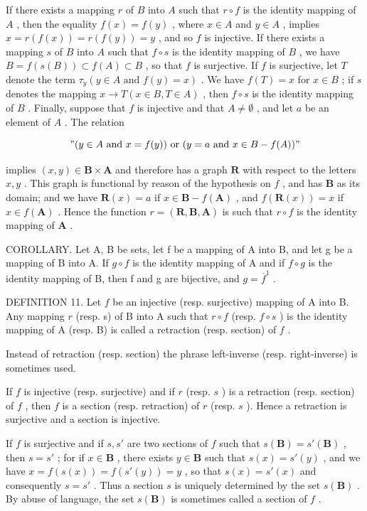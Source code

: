 If there exists a mapping \(r\) of \(B\) into \(A\) such that \(r \circ f\) is the identity mapping of \(A\) , then the equality \(f(x) = f(y)\) , where \(x \in A\) and \(y \in A\) , implies \(x = r(f(x)) = r(f(y)) = y\) , and so \(f\) is injective. If there exists a mapping \(s\) of \(B\) into \(A\) such that \(f \circ s\) is the identity mapping of \(B\) , we have \(B = f(s(B)) \subset f(A) \subset B\) , so that \(f\) is surjective. If \(f\) is surjective, let \(T\) denote the term \(\tau_y(y \in A \text{ and } f(y) = x)\) . We have \(f(T) = x\) for \(x \in B\) ; if \(s\) denotes the mapping \(x \to T (x \in B, T \in A)\) , then \(f \circ s\) is the identity mapping of \(B\) . Finally, suppose that \(f\) is injective and that \(A \neq \emptyset\) , and let \(a\) be an element of \(A\) . The relation

\[
" (y \in A \text {   and   } x = f (y)) \text {   or   } (y = a \text {   and   } x \in B - f (A))"
\]

implies \((x, y) \in \mathbf{B} \times \mathbf{A}\) and therefore has a graph \(\mathbf{R}\) with respect to the letters \(x, y\) . This graph is functional by reason of the hypothesis on \(f\) , and has \(\mathbf{B}\) as its domain; and we have \(\mathbf{R}(x) = a\) if \(x \in \mathbf{B} - f(\mathbf{A})\) , and \(f(\mathbf{R}(x)) = x\) if \(x \in f(\mathbf{A})\) . Hence the function \(r = (\mathbf{R}, \mathbf{B}, \mathbf{A})\) is such that \(r \circ f\) is the identity mapping of \(\mathbf{A}\) .

COROLLARY. Let A, B be sets, let f be a mapping of A into B, and let g be a mapping of B into A. If \(g \circ f\) is the identity mapping of A and if \(f \circ g\) is the identity mapping of B, then f and g are bijective, and \(g = \overline{f}^{1}\) .

DEFINITION 11. Let \(f\) be an injective (resp. surjective) mapping of A into B. Any mapping \(r\) (resp. s) of B into A such that \(r \circ f\) (resp. \(f \circ s\) ) is the identity mapping of A (resp. B) is called a retraction (resp. section) of \(f\) .

Instead of retraction (resp. section) the phrase left-inverse (resp. right-inverse) is sometimes used.

If \(f\) is injective (resp. surjective) and if \(r\) (resp. \(s\) ) is a retraction (resp. section) of \(f\) , then \(f\) is a section (resp. retraction) of \(r\) (resp. \(s\) ). Hence a retraction is surjective and a section is injective.

If \(f\) is surjective and if \(s, s'\) are two sections of \(f\) such that \(s(\mathbf{B}) = s'(\mathbf{B})\) , then \(s = s'\) ; for if \(x \in \mathbf{B}\) , there exists \(y \in \mathbf{B}\) such that \(s(x) = s'(y)\) , and we have \(x = f(s(x)) = f(s'(y)) = y\) , so that \(s(x) = s'(x)\) and consequently \(s = s'\) . Thus a section \(s\) is uniquely determined by the set \(s(\mathbf{B})\) . By abuse of language, the set \(s(\mathbf{B})\) is sometimes called a section of \(f\) .

